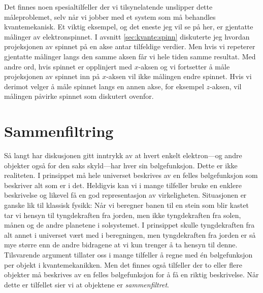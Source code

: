 Det finnes noen spesialtilfeller der vi tilsynelatende unslipper dette måle\-problemet, selv når vi jobber med et system som må behandles kvante\-mekanisk. Et viktig eksempel, og det eneste jeg vil se på her, er gjentatte målinger av elektronspinnet. I avsnitt \ref{sec:kvante:spinn} diskuterte jeg hvordan projeksjonen av spinnet på en akse antar tilfeldige verdier. Men hvis vi repeterer gjentatte målinger langs den samme aksen får vi hele tiden samme resultat. Med andre ord, hvis spinnet er opplinjert med $x$-aksen og vi fortsetter å måle projeksjonen av spinnet inn på $x$-aksen vil ikke målingen endre spinnet. Hvis vi derimot velger å måle spinnet langs en annen akse, for eksempel $z$-aksen, vil målingen påvirke spinnet som diskutert ovenfor.

\section{Sammenfiltring}
Så langt har diskusjonen gitt inntrykk av at hvert enkelt elektron---og andre objekter også for den saks skyld---har hver sin bølgefunksjon. Dette er ikke realiteten. I prinsippet må hele universet beskrives av en felles bølgefunksjon som beskriver alt som er i det. Heldigvis kan vi i mange tilfeller bruke en enklere beskrivelse og likevel få en god representasjon av virkeligheten. Situasjonen er ganske lik til klassisk fysikk: Når vi beregner banen til en stein som blir kastet tar vi hensyn til tyngdekraften fra jorden, men ikke tyngdekraften fra solen, månen og de andre planetene i solsystemet. I prinsippet skulle tyngdekraften fra alt annet i universet vært med i beregningen, men tyngdekraften fra jorden er så mye større enn de andre bidragene at vi kun trenger å ta hensyn til denne. Tilsvarende argument tillater oss i mange tilfeller å regne med \'en bølgefunksjon per objekt i kvantemekanikken. Men det finnes også tilfeller der to eller flere objekter må beskrives av en felles bølgefunksjon for å få en riktig beskrivelse. Når dette er tilfellet sier vi at objektene er \emph{sammenfiltret}. 

